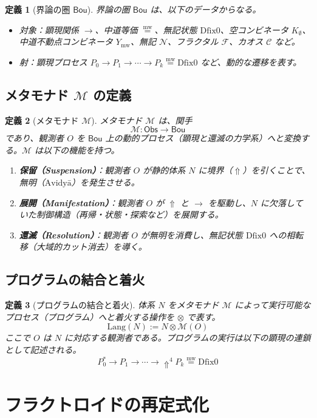 \documentclass[11pt]{article}
\newcommand{\Bou}{\textsf{Bou}}
\newcommand{\Obs}{\textsf{Obs}}
\newcommand{\M}{\mathcal{M}}
\newcommand{\Lang}{\text{Lang}}
\newcommand{\Avidya}{\text{Avidyā}}
\newcommand{\Dfix}{\text{Dfix0}}
\newcommand{\metanegation}{\Uparrow}
\newcommand{\mw}{\stackrel{\text{mw}}{=}}
\newcommand{\Kempty}{K_\emptyset}
\newcommand{\Ymw}{Y_{\text{mw}}}
\newcommand{\N}{\mathcal{N}}
\newcommand{\F}{\mathcal{F}}
\newcommand{\C}{\mathcal{C}}
\newtheorem{definition}{定義}
\begin{document}
\begin{definition}[界論の圏 $\Bou$]
界論の圏 $\Bou$ は、以下のデータからなる。
\begin{itemize}
\item 対象：顕現関係 $\to$、中道等価 $\mw$、無記状態 $\Dfix$、空コンビネータ $\Kempty$、中道不動点コンビネータ $\Ymw$、無記 $\N$、フラクタル $\F$、カオス $\C$ など。
\item 射：顕現プロセス $P_0 \to P_1 \to \cdots \to P_k \mw \Dfix$ など、動的な遷移を表す。
\end{itemize}
\end{definition}

\subsection{メタモナド $\M$ の定義}

\begin{definition}[メタモナド $\M$]
メタモナド $\M$ は、関手
\[
\M : \Obs \to \Bou
\]
であり、観測者 $O$ を $\Bou$ 上の動的プロセス（顕現と還滅の力学系）へと変換する。$\M$ は以下の機能を持つ。
\begin{enumerate}
\item \textbf{保留（Suspension）}：観測者 $O$ が静的体系 $N$ に境界（$\metanegation$）を引くことで、無明（$\Avidya$）を発生させる。
\item \textbf{展開（Manifestation）}：観測者 $O$ が $\metanegation$ と $\to$ を駆動し、$N$ に欠落していた制御構造（再帰・状態・探索など）を展開する。
\item \textbf{還滅（Resolution）}：観測者 $O$ が無明を消費し、無記状態 $\Dfix$ への相転移（大域的カット消去）を導く。
\end{enumerate}
\end{definition}

\subsection{プログラムの結合と着火}

\begin{definition}[プログラムの結合と着火]
体系 $N$ をメタモナド $\M$ によって実行可能なプロセス（プログラム）へと着火する操作を $\otimes$ で表す。
\[
\Lang(N) := N \otimes \M(O)
\]
ここで $O$ は $N$ に対応する観測者である。プログラムの実行は以下の顕現の連鎖として記述される。
\[
P_0^* \to P_1 \to \cdots \to \metanegation^4 P_k \mw \Dfix
\]
\end{definition}

\section{フラクトロイドの再定式化}
\end{document}
